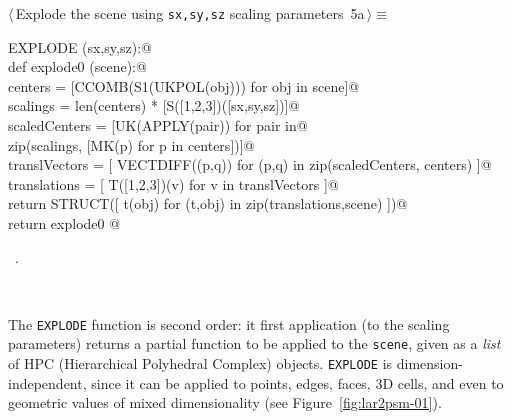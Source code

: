 \documentclass[11pt,oneside]{article}	%
\begin{document}
\begin{flushleft} \small
\begin{minipage}{\linewidth} \label{scrap12}
\protect{}$\langle\,$Explode the scene using \texttt{sx,sy,sz} scaling parameters\nobreak\ {\footnotesize 5a}$\,\rangle\equiv$
\vspace{-1ex}
\begin{list}{}{} \item
\mbox{}\verb@def EXPLODE (sx,sy,sz):@\\
\mbox{}\verb@    def explode0 (scene):@\\
\mbox{}\verb@        centers = [CCOMB(S1(UKPOL(obj))) for obj in scene]@\\
\mbox{}\verb@        scalings = len(centers) * [S([1,2,3])([sx,sy,sz])]@\\
\mbox{}\verb@        scaledCenters = [UK(APPLY(pair)) for pair in@\\
\mbox{}\verb@                         zip(scalings, [MK(p) for p in centers])]@\\
\mbox{}\verb@        translVectors = [ VECTDIFF((p,q)) for (p,q) in zip(scaledCenters, centers) ]@\\
\mbox{}\verb@        translations = [ T([1,2,3])(v) for v in translVectors ]@\\
\mbox{}\verb@        return STRUCT([ t(obj) for (t,obj) in zip(translations,scene) ])@\\
\mbox{}\verb@    return explode0  @\\
\mbox{}\verb@@{\NWsep}
\end{list}
\vspace{-1ex}
\footnotesize\addtolength{\baselineskip}{-1ex}
\begin{list}{}{\setlength{\itemsep}{-\parsep}\setlength{\itemindent}{-\leftmargin}}
\item \NWtxtMacroRefIn\ .
\end{list}
\end{minipage}\\[4ex]
\end{flushleft}

The \texttt{EXPLODE} function is second order: it first application (to the scaling parameters) returns a partial function to be applied to the \texttt{scene}, given as a \emph{list} of HPC (Hierarchical Polyhedral Complex) objects. 
\texttt{EXPLODE} is dimension-independent, since it can be applied to points, edges, faces, 3D cells, and even to geometric values of mixed dimensionality (see Figure~\ref{fig:lar2psm-01}).
\end{document}
